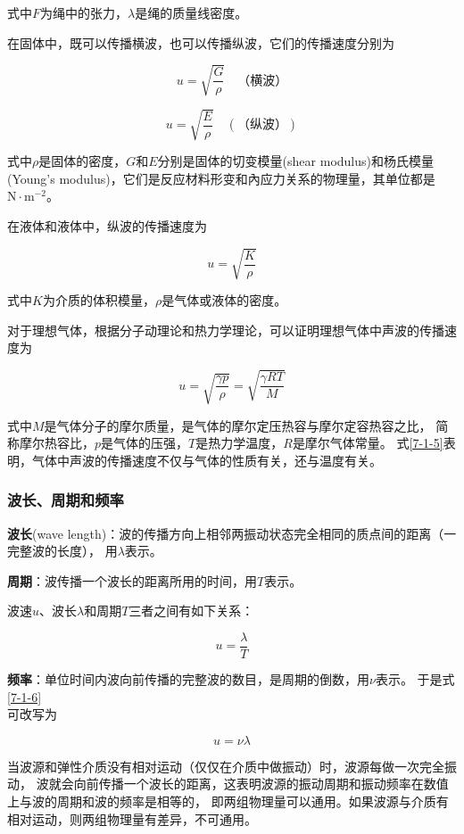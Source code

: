 \documentclass[12pt, a4paper]{article}
\numberwithin{equation}{section}
\begin{document}
    式中\(F \)为绳中的张力，\(\lambda\)是绳的质量线密度。

    在固体中，既可以传播横波，也可以传播纵波，它们的传播速度分别为

    \begin{equation}
        u=\sqrt{\frac{G}{\rho}} \quad \text{（横波）}
    \end{equation}

    \begin{equation}
        u=\sqrt{\frac{E}{\rho}} \quad(\text{（纵波）})
    \end{equation}
    
    式中\(\rho\)是固体的密度，\(G\)和\(E\)分别是固体的切变模量(shear modulus)和杨氏模量\\
    (Young's modulus)，它们是反应材料形变和內应力关系的物理量，其单位都是\(\mathrm{N \cdot m^{-2}}\)。

    在液体和液体中，纵波的传播速度为

    \begin{equation}
        u=\sqrt{\frac{K}{\rho}}
    \end{equation}

    式中\(K\)为介质的体积模量，\(\rho\)是气体或液体的密度。

    对于理想气体，根据分子动理论和热力学理论，可以证明理想气体中声波的传播速度为

    \begin{equation}
        u=\sqrt{\frac{\gamma p}{\rho}}=\sqrt{\frac{\gamma R T}{M}}
        \label{7-1-5}
    \end{equation}

    式中\(M\)是气体分子的摩尔质量，是气体的摩尔定压热容与摩尔定容热容之比，
    简称摩尔热容比，\(p\)是气体的压强，\(T\)是热力学温度，\(R \)是摩尔气体常量。
    式\ref{7-1-5}表明，气体中声波的传播速度不仅与气体的性质有关，还与温度有关。

\subsubsection{波长、周期和频率}

    \textbf{波长}(wave length)：波的传播方向上相邻两振动状态完全相同的质点间的距离（一完整波的长度），
    用\(\lambda\)表示。

    \textbf{周期}：波传播一个波长的距离所用的时间，用\(T \)表示。

    波速\(u \)、波长\(\lambda\)和周期\(T \)三者之间有如下关系：

    \begin{equation}
        u=\frac{\lambda}{T}
        \label{7-1-6}
    \end{equation}

    \textbf{频率}：单位时间内波向前传播的完整波的数目，是周期的倒数，用\(\nu\)表示。
    于是式\ref{7-1-6}\\可改写为

    \begin{equation}
        u=\nu \lambda
    \end{equation}

    当波源和弹性介质没有相对运动（仅仅在介质中做振动）时，波源每做一次完全振动，
    波就会向前传播一个波长的距离，这表明波源的振动周期和振动频率在数值上与波的周期和波的频率是相等的，
    即两组物理量可以通用。如果波源与介质有相对运动，则两组物理量有差异，不可通用。
\end{document}
